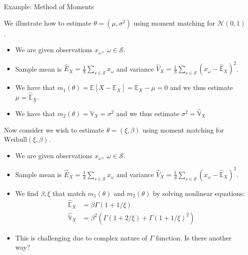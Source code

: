 \documentclass[9pt]{beamer}
\begin{document}
%
\begin{frame}{Example: Method of Moments}

We illustrate how to estimate $\theta=(\mu,\sigma^2)$ using moment matching for $\mathcal{N}(0,1)$.
\begin{itemize}
\setlength{\itemsep}{10pt}
\item We are given observations $x_\omega,\; \omega \in \mathcal{S}$.
\item Sample mean is $\hat{E}_X=\frac{1}{S}\sum_{s\in\mathcal{S}}x_\omega$ and variance $\hat{V}_X=\frac{1}{S}\sum_{s\in\mathcal{S}}(x_\omega-\hat{\mathbb{E}}_X)^2$. 
\item We have that $m_1(\theta)=\mathbb{E}[X-\mathbb{E}_X]=\mathbb{E}_X-\mu=0$ and we thus estimate $\mu=\hat{\mathbb{E}}_X$.
\item We have that $m_2(\theta)=\mathbb{V}_X=\sigma^2$ and we thus estimate $\sigma^2=\hat{\mathbb{V}}_X$
\end{itemize}
Now consider we wish to estimate $\theta=(\xi,\beta)$ using moment matching for $\textrm{Weibull}(\xi,\beta)$. 
\begin{itemize}
\item We are given observations $x_\omega,\; \omega \in \mathcal{S}$.
\item Sample mean is $\hat{E}_X=\frac{1}{S}\sum_{s\in\mathcal{S}}x_\omega$ and variance $\hat{V}_X=\frac{1}{S}\sum_{s\in\mathcal{S}}(x_\omega-\hat{\mathbb{E}}_X)^2$. 
\item We find $\beta,\xi$ that match $m_1(\theta)$ and $m_2(\theta)$ by solving nonlinear equations:
\begin{align*}
\hat{\mathbb{E}}_X&=\beta\Gamma(1+1/\xi)\\
\hat{\mathbb{V}}_X&=\beta^2\left(\Gamma(1+2/\xi)+\Gamma(1+1/\xi)^2\right)
\end{align*}
\item This is challenging due to complex nature of $\Gamma$ function.  Is there another way?
\end{itemize}
\end{frame}
\end{document}
